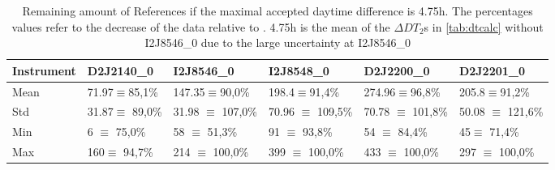 \documentclass  [
  paper    = a4,
  BCOR     = 10mm,
  twoside,
  fontsize = 12pt,
  fleqn,
  toc      = bibnumbered,
  toc      = listofnumbered,
  numbers  = noendperiod,
  headings = normal,
  listof   = leveldown,
  version  = 3.03
]                                       {scrreprt}
\begin{document}
	\begin{table}
	\begin{tabular}{|p{2cm}|p{2cm}|p{2cm}|p{2cm}|p{2cm}|p{2cm}|}
		Instrument	&D2J2140\_0&I2J8546\_0& I2J8548\_0&D2J2200\_0&D2J2201\_0\\
		\toprule
		Mean&
		71.97$\equiv$85,1\% &		147.35$\equiv$90,0\%&
		198.4$\equiv$91,4\%&		274.96$\equiv$96,8\%&
		205.8$\equiv$91,2\%\\
		\midrule
		Std&		31.87$\equiv$	89,0\%&31.98 $\equiv$	107,0\%&
		70.96 $\equiv$	109,5\%&		70.78 $\equiv$	101,8\%&
		50.08 $\equiv$	121,6\% \\
		\midrule
		Min&
		6 $\equiv$	75,0\%&		58 $\equiv$	51,3\%
		&91 $\equiv$	93,8\%		&54  $\equiv$	84,4\%
		&45$\equiv$	71,4\%\\
		\midrule
		Max&
		160$\equiv$	94,7\% &
		214 $\equiv$	100,0\% &
		399 $\equiv$	100,0\% &
		433  $\equiv$	100,0\% &
		297 $\equiv$	100,0\% \\
		\bottomrule
	\end{tabular}
	\caption{Remaining amount of References if the maximal accepted daytime difference is 4.75h. The percentages values refer to the decrease of the data relative to . 4.75h is the mean of the 	$\Delta DT_{2}$s in \cref{tab:dtcalc} without I2J8546\_0 due to the large uncertainty at I2J8546\_0}
	\label{tab:daytimerest}
\end{table}	
\end{document}

